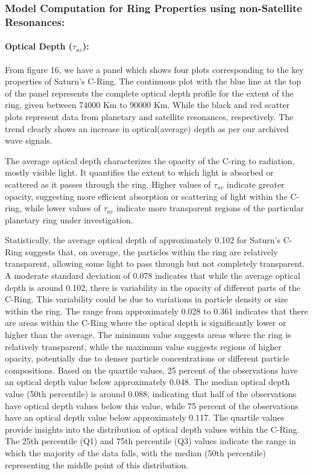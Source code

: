 \documentclass{article}
\begin{document}
\subsubsection{Model Computation for Ring Properties using non-Satellite Resonances:}

\paragraph{Optical Depth ($\tau_{av}$):}
From figure 16, we have a panel which shows four plots corresponding to the key properties of Saturn's C-Ring. The continuous plot with the blue line at the top of the panel represents the complete optical depth profile for the extent of the ring, given between 74000 Km to 90000 Km. While the black and red scatter plots represent data from planetary and satellite resonances, respectively. The trend clearly shows an increase in optical(average) depth as per our archived wave signals. 

The average optical depth characterizes the opacity of the C-ring to radiation, mostly visible light. It quantifies the extent to which light is absorbed or scattered as it passes through the ring. Higher values of $\tau_{av}$ indicate greater opacity, suggesting more efficient absorption or scattering of light within the C-ring, while lower values of $\tau_{av}$ indicate more transparent regions of the particular planetary ring under investigation.

Statistically, the average optical depth of approximately 0.102 for Saturn's C-Ring suggests that, on average, the particles within the ring are relatively transparent, allowing some light to pass through but not completely transparent. A moderate standard deviation of 0.078 indicates that while the average optical depth is around 0.102, there is variability in the opacity of different parts of the C-Ring. This variability could be due to variations in particle density or size within the ring. The range from approximately 0.028 to 0.361 indicates that there are areas within the C-Ring where the optical depth is significantly lower or higher than the average. The minimum value suggests areas where the ring is relatively transparent, while the maximum value suggests regions of higher opacity, potentially due to denser particle concentrations or different particle compositions. Based on the quartile values, 25 percent of the observations have an optical depth value below approximately 0.048. The median optical depth value (50th percentile) is around 0.088, indicating that half of the observations have optical depth values below this value, while 75 percent of the observations have an optical depth value below approximately 0.117. The quartile values provide insights into the distribution of optical depth values within the C-Ring. The 25th percentile (Q1) and 75th percentile (Q3) values indicate the range in which the majority of the data falls, with the median (50th percentile) representing the middle point of this distribution. 
\end{document}
